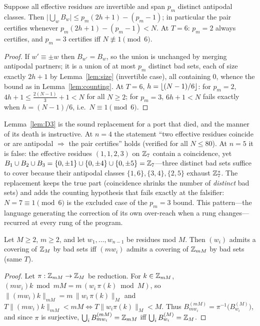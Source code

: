 \begin{lemma}\label{lem:D3}
Suppose all effective residues are invertible and span $p_m$ distinct
antipodal classes. Then
$\bigl|\bigcup_w B_w\bigr|\le p_m(2h+1)-(p_m-1)$; in particular the pair
certifies whenever $p_m(2h+1)-(p_m-1)<N$. At $T=6$: $p_m=2$ always
certifies, and $p_m=3$ certifies iff $N\not\equiv 1\pmod 6$.
\end{lemma}

\begin{proof}
If $w'\equiv\pm w$ then $B_{w'}=B_w$, so the union is unchanged by merging
antipodal partners; it is a union of at most $p_m$ distinct bad sets, each
of size exactly $2h+1$ by Lemma~\ref{lem:size} (invertible case), all
containing $0$, whence the bound as in Lemma~\ref{lem:counting}. At $T=6$,
$h=\left\lfloor (N-1)/6 \right\rfloor$: for $p_m=2$,
$4h+1\le\tfrac{2(N-1)}{3}+1<N$ for all $N\ge 2$; for $p_m=3$,
$6h+1<N$ fails exactly when $h=(N-1)/6$, i.e.\ $N\equiv1\pmod 6$.
\end{proof}

Lemma~\ref{lem:D3} is the sound replacement for a port that died, and the
manner of its death is instructive. At $n=4$ the statement ``two effective
residues coincide or are antipodal $\Rightarrow$ the pair certifies'' holds
(verified for all $N\le 80$). At $n=5$ it is false: the effective residues
$(1,1,2,3)$ on $\mathbb{Z}_7$ contain a coincidence, yet
$B_1\cup B_2\cup B_3=\{0,\pm1\}\cup\{0,\pm4\}\cup\{0,\pm5\}=\mathbb{Z}_7$---three
distinct bad sets suffice to cover because their antipodal classes
$\{1,6\},\{3,4\},\{2,5\}$ exhaust $\mathbb{Z}_7^\ast$. The replacement keeps the
true part (coincidence shrinks the number of \emph{distinct} bad sets) and
adds the counting hypothesis that fails exactly at the falsifier:
$N=7\equiv 1 \pmod 6$ is the excluded case of the $p_m=3$ bound. This
pattern---the language generating the correction of its own over-reach
when a rung changes---recurred at every rung of the program.

\begin{lemma}\label{lem:lift}
Let $M\ge 2$, $m\ge 2$, and let $w_1,\dots,w_{n-1}$ be residues mod $M$.
Then $(w_i)$ admits a covering of $\mathbb{Z}_M$ by bad sets iff
$(mw_i)$ admits a covering of $\mathbb{Z}_{mM}$ by bad sets (same $T$).
\end{lemma}

\begin{proof}
Let $\pi:\mathbb{Z}_{mM}\to\mathbb{Z}_M$ be reduction. For $k\in\mathbb{Z}_{mM}$,
$(mw_i)k\bmod mM=m\,(w_i\,\pi(k)\bmod M)$, so
$\lVert (mw_i)k\rVert_{mM}=m\,\lVert w_i\,\pi(k)\rVert_{M}$ and
$T\lVert (mw_i)k\rVert_{mM}<mM\iff T\lVert w_i\pi(k)\rVert_{M}<M$. Thus
$B^{(mM)}_{mw_i}=\pi^{-1}\bigl(B^{(M)}_{w_i}\bigr)$, and since $\pi$ is
surjective, $\bigcup_i B^{(mM)}_{mw_i}=\mathbb{Z}_{mM}$ iff
$\bigcup_i B^{(M)}_{w_i}=\mathbb{Z}_M$.
\end{proof}

